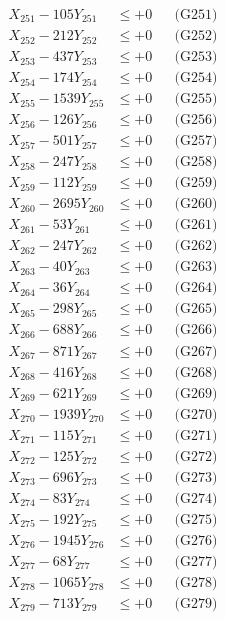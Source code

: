 \documentclass[a4paper,10pt]{article}
\begin{document}
{\begin{align}
\allowbreak
X_{251} - 105Y_{251} &\leq +0 && \text{(G251)} \\
X_{252} - 212Y_{252} &\leq +0 && \text{(G252)} \\
X_{253} - 437Y_{253} &\leq +0 && \text{(G253)} \\
X_{254} - 174Y_{254} &\leq +0 && \text{(G254)} \\
X_{255} - 1539Y_{255} &\leq +0 && \text{(G255)} \\
X_{256} - 126Y_{256} &\leq +0 && \text{(G256)} \\
X_{257} - 501Y_{257} &\leq +0 && \text{(G257)} \\
X_{258} - 247Y_{258} &\leq +0 && \text{(G258)} \\
X_{259} - 112Y_{259} &\leq +0 && \text{(G259)} \\
X_{260} - 2695Y_{260} &\leq +0 && \text{(G260)} \\
\allowbreak
X_{261} - 53Y_{261} &\leq +0 && \text{(G261)} \\
X_{262} - 247Y_{262} &\leq +0 && \text{(G262)} \\
X_{263} - 40Y_{263} &\leq +0 && \text{(G263)} \\
X_{264} - 36Y_{264} &\leq +0 && \text{(G264)} \\
X_{265} - 298Y_{265} &\leq +0 && \text{(G265)} \\
X_{266} - 688Y_{266} &\leq +0 && \text{(G266)} \\
X_{267} - 871Y_{267} &\leq +0 && \text{(G267)} \\
X_{268} - 416Y_{268} &\leq +0 && \text{(G268)} \\
X_{269} - 621Y_{269} &\leq +0 && \text{(G269)} \\
X_{270} - 1939Y_{270} &\leq +0 && \text{(G270)} \\
\allowbreak
X_{271} - 115Y_{271} &\leq +0 && \text{(G271)} \\
X_{272} - 125Y_{272} &\leq +0 && \text{(G272)} \\
X_{273} - 696Y_{273} &\leq +0 && \text{(G273)} \\
X_{274} - 83Y_{274} &\leq +0 && \text{(G274)} \\
X_{275} - 192Y_{275} &\leq +0 && \text{(G275)} \\
X_{276} - 1945Y_{276} &\leq +0 && \text{(G276)} \\
X_{277} - 68Y_{277} &\leq +0 && \text{(G277)} \\
X_{278} - 1065Y_{278} &\leq +0 && \text{(G278)} \\
X_{279} - 713Y_{279} &\leq +0 && \text{(G279)} \\

\end{align}}
\end{document}
